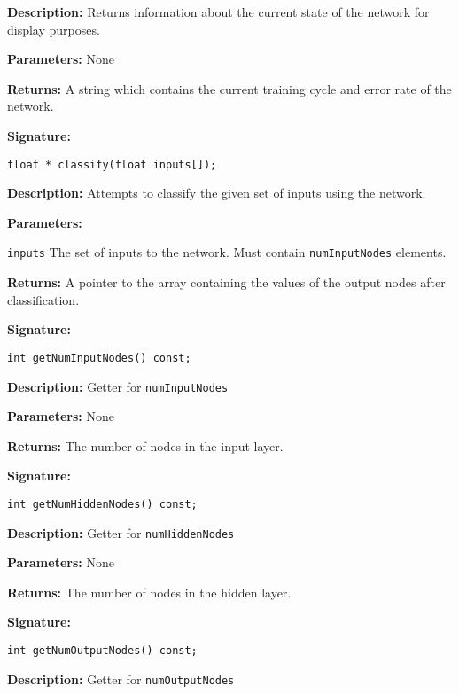 \documentclass[a4paper]{article}
\begin{document}
\textbf{Description: }
Returns information about the current state of the network for display purposes.

\textbf{Parameters: } None

\textbf{Returns: }
A string which contains the current training cycle and error rate of the network.

\hrulefill %

\textbf{Signature:} \begin{lstlisting}
float * classify(float inputs[]);
\end{lstlisting}
\textbf{Description: }
Attempts to classify the given set of inputs using the network.

\textbf{Parameters: }

\lstinline{inputs} The set of inputs to the network. Must contain \lstinline{numInputNodes} elements.

\textbf{Returns: }
A pointer to the array containing the values of the output nodes after classification. 
\hrulefill %

\textbf{Signature:} \begin{lstlisting}
int getNumInputNodes() const;
\end{lstlisting}

\textbf{Description: }
Getter for \lstinline{numInputNodes}

\textbf{Parameters: } None

\textbf{Returns: }
The number of nodes in the input layer.

\hrulefill %

\textbf{Signature:} \begin{lstlisting}
int getNumHiddenNodes() const;
\end{lstlisting}

\textbf{Description: }
Getter for \lstinline{numHiddenNodes}

\textbf{Parameters: } None

\textbf{Returns: }
The number of nodes in the hidden layer.

\hrulefill %

\textbf{Signature:} \begin{lstlisting}
int getNumOutputNodes() const;
\end{lstlisting}

\textbf{Description: }
Getter for \lstinline{numOutputNodes}
\end{document}
